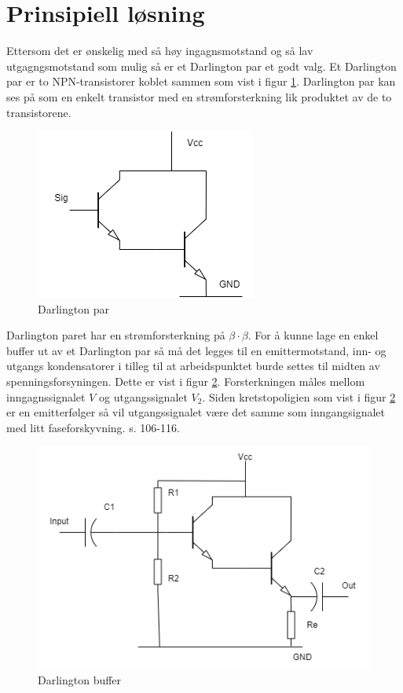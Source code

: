 \newpage
\section{Prinsipiell løsning}
\label{prinsipiellLoesning}

Ettersom det er ønskelig med så høy ingagnsmotstand og så lav utgagngsmotstand som mulig så er et Darlington par et godt valg. Et Darlington par er to NPN-transistorer koblet sammen som vist i figur \ref{fig:Darlington_basic}. Darlington par kan ses på som en enkelt transistor med en strømforsterkning lik produktet av de to transistorene.

\begin{figure}[H]
\centering
\includegraphics[scale=0.5]{bilder/Darlington_basic.drawio.png}
\caption{Darlington par}
\label{fig:Darlington_basic}
\end{figure}

Darlington paret har en strømforsterkning på $\beta \cdot \beta$. For å kunne lage en enkel buffer ut av et Darlington par så må det legges til en emittermotstand, inn- og utgangs kondensatorer i tilleg til at arbeidspunktet burde settes til midten av spenningsforsyningen. Dette er vist i figur \ref{fig:Darlington_buffer}. Forsterkningen måles mellom inngagnssignalet $V$ og utgangssignalet $V_2$. Siden kretstopoligien som vist i figur \ref{fig:Darlington_buffer} er en emitterfølger så vil utgangssignalet være det samme som inngangsignalet med litt faseforskyvning. \cite{Art_of_Electronics} s. 106-116.

\begin{figure}[H]
\centering
\includegraphics[scale=0.8]{bilder/Darlington_buffer.drawio.png}
\caption{Darlington buffer}
\label{fig:Darlington_buffer}
\end{figure}



